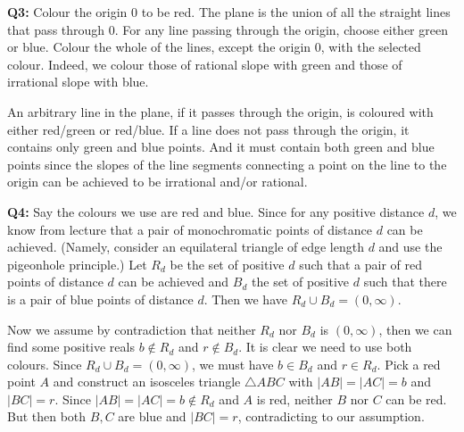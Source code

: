 \documentclass[12pt,reqno]{amsart}
\theoremstyle{definition}
\begin{document}



\newpage

\noindent \textbf{Q3:} Colour the origin 0 to be red. The plane is the union of all the straight lines that pass through 0. For any line passing through the origin, choose either green or blue. Colour the whole of the lines, except the origin 0, with the selected colour. Indeed, we colour those of rational slope with green and those of irrational slope with blue.

An arbitrary line in the plane, if it passes through the origin, is coloured with either red/green or red/blue. If a line does not pass through the origin, it contains only green and blue points. And it must contain both green and blue points since the slopes of the line segments connecting a point on the line to the origin can be achieved to be irrational and/or rational.


\newpage

\noindent \textbf{Q4:} Say the colours we use are red and blue. Since for any positive distance $d$, we know from lecture that a pair of monochromatic points of distance $d$ can be achieved. (Namely, consider an equilateral triangle of edge length $d$ and use the pigeonhole principle.) Let $R_d$ be the set of positive $d$ such that a pair of red points of distance $d$ can be achieved and $B_d$ the set of positive $d$ such that there is a pair of blue points of distance $d$. Then we have $R_d\cup B_d=(0,\infty)$.

Now we assume by contradiction that neither $R_d$ nor $B_d$ is $(0,\infty)$, then we can find some positive reals $b\notin R_d$ and $r\notin B_d$. It is clear we need to use both colours. Since $R_d\cup B_d=(0,\infty)$, we must have $b\in B_d$ and $r\in R_d$. Pick a red point $A$ and construct an isosceles triangle $\triangle ABC$ with  $|AB|=|AC|=b$ and $|BC|=r$. Since $|AB|=|AC|=b\notin R_d$ and $A$ is red, neither $B$ nor $C$ can be red. But then both $B,C$ are blue and $|BC|=r$, contradicting to our assumption.
\end{document}
